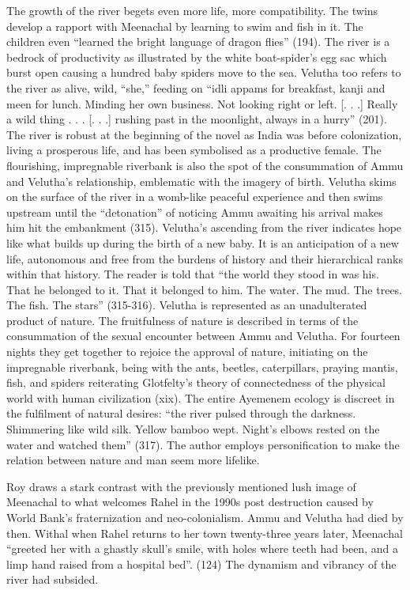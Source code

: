 The growth of the river begets even more life, more compatibility. The twins develop a rapport with Meenachal by learning to swim and fish in it. The children even “learned the bright language of dragon flies” (194). The river is a bedrock of productivity as illustrated by the white boat-spider’s egg sac which burst open causing a hundred baby spiders move to the sea. Velutha too refers to the river as alive, wild,  “she,” feeding on “idli appams for breakfast, kanji and meen for lunch. Minding her own business. Not looking right or left. [. . .] Really a wild thing . . . [. . .] rushing past in the moonlight, always in a hurry” (201). The river is robust at the beginning of the novel as India was before colonization, living a prosperous life, and has been symbolised as a productive female. 
The flourishing, impregnable riverbank is also the spot of the consummation of Ammu and Velutha’s relationship, emblematic with the imagery of birth. Velutha skims on the surface of the river in a womb-like peaceful experience and then swims upstream until the “detonation” of noticing Ammu awaiting his arrival makes him hit the embankment (315). Velutha’s ascending from the river indicates hope like what builds up during the birth of a new baby. It is an anticipation of a new life, autonomous and free from the burdens of history and their hierarchical ranks within that history. The reader is told that “the world they stood in was his. That he belonged to it. That it belonged to him. The water. The mud. The trees. The fish. The stars” (315-316).  Velutha is represented as an unadulterated product of nature. The fruitfulness of nature is described in terms of the consummation of the sexual encounter between Ammu and Velutha. For fourteen nights they get together to rejoice the approval of nature, initiating on the impregnable riverbank, being with the ants, beetles, caterpillars, praying mantis, fish, and spiders reiterating Glotfelty’s theory of connectedness of the physical world with human civilization (xix). The entire Ayemenem ecology is discreet in the fulfilment of natural desires: “the river pulsed through the darkness. Shimmering like wild silk. Yellow bamboo wept. Night’s elbows rested on the water and watched them” (317). The author employs personification to make the relation between nature and man seem more lifelike. 


Roy draws a stark contrast with the previously mentioned lush image of Meenachal to what welcomes Rahel in the 1990s post destruction caused by World Bank’s fraternization and neo-colonialism. Ammu and Velutha had died by then. Withal when Rahel returns to her town twenty-three years later, Meenachal “greeted her with a ghastly skull’s smile, with holes where teeth had been, and a limp hand raised from a hospital bed”. (124)  The dynamism and vibrancy of the river had subsided. 

